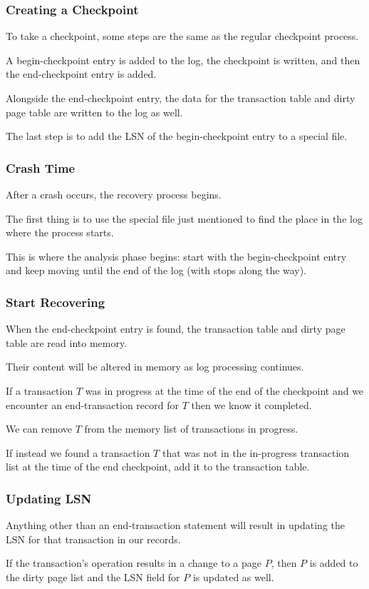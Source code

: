 \begin{frame}
\frametitle{Creating a Checkpoint}

To take a checkpoint, some steps are the same as the regular checkpoint process. 

A begin-checkpoint entry is added to the log, the checkpoint is written, and then the end-checkpoint entry is added. 

Alongside the end-checkpoint entry, the data for the transaction table and dirty page table are written to the log as well.

The last step is to add the LSN of the begin-checkpoint entry to a special file.

\end{frame}


\begin{frame}
\frametitle{Crash Time}

After a crash occurs, the recovery process begins. 

The first thing is to use the special file just mentioned to find the place in the log where the process starts. 

This is where the analysis phase begins: start with the begin-checkpoint entry and keep moving until the end of the log (with stops along the way). 

\end{frame}

\begin{frame}
\frametitle{Start Recovering}

When the end-checkpoint entry is found, the transaction table and dirty page table are read into memory. 

Their content will be altered in memory as log processing continues. 

If a transaction $T$ was in progress at the time of the end of the checkpoint and we encounter an end-transaction record for $T$ then we know it completed.

We can remove $T$ from the memory list of transactions in progress. 

If instead we found a transaction $T$ that was not in the in-progress transaction list at the time of the end checkpoint, add it to the transaction table. 

\end{frame}

\begin{frame}
\frametitle{Updating LSN}

Anything other than an end-transaction statement will result in updating the LSN for that transaction in our records. 

If the transaction's operation results in a change to a page $P$, then $P$ is added to the dirty page list and the LSN field for $P$ is updated as well. 

\end{frame}

